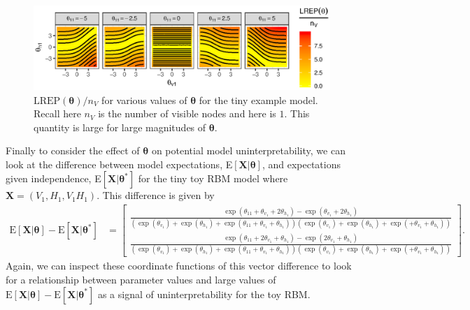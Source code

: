 \documentclass[]{article}
\theoremstyle{definition}
\newcommand{\nv}{{n_{\scriptscriptstyle V}}}
\begin{document}
\par
\begin{figure}

{\centering \includegraphics{paper_files/figure-latex/instab-1} 

}

\caption{$\text{LREP}(\boldsymbol \theta)/\nv$ for various values of $\boldsymbol \theta$ for the tiny example model. Recall here $\nv$ is the number of visible nodes and here is $1$. This quantity is large for large magnitudes of $\boldsymbol \theta$.}\label{fig:instab}
\end{figure}
Finally to consider the effect of \(\boldsymbol \theta\) on potential
model uninterpretability, we can look at the difference between model
expectations, E\(\left[\boldsymbol X | \boldsymbol \theta\right]\), and
expectations given independence,
E\(\left[\boldsymbol X | \boldsymbol \theta^*\right ]\) for the tiny toy
RBM model where \(\boldsymbol X = (V_1, H_1, V_1 H_1)\). This difference
is given by \begin{align*}
\text{E}\left[\boldsymbol X | \boldsymbol \theta\right] -   \text{E}\left[\boldsymbol X | \boldsymbol \theta^* \right] 
&= \left[
\begin{matrix}
\frac{\exp\left(\theta_{11} + \theta_{v_1} + 2\theta_{h_1}\right) - \exp\left( \theta_{v_1} + 2\theta_{h_1}\right) }{\left(\exp\left(\theta_{v_1}\right) + \exp\left(\theta_{h_1}\right) + \exp\left(\theta_{11} + \theta_{v_1} + \theta_{h_1}\right)\right)\left(\exp\left(\theta_{v_1}\right) + \exp\left(\theta_{h_1}\right) + \exp\left(+ \theta_{v_1} + \theta_{h_1}\right)\right)} \\
\frac{\exp\left(\theta_{11} + 2\theta_{v_1} + \theta_{h_1}\right) - \exp\left( 2\theta_{v_1} + \theta_{h_1}\right)  }{\left(\exp\left(\theta_{v_1}\right) + \exp\left(\theta_{h_1}\right) + \exp\left(\theta_{11} + \theta_{v_1} + \theta_{h_1}\right)\right)\left(\exp\left(\theta_{v_1}\right) + \exp\left(\theta_{h_1}\right) + \exp\left(+ \theta_{v_1} + \theta_{h_1}\right)\right)}
\end{matrix}\right].
\end{align*}
Again, we can inspect these coordinate functions of this vector
difference to look for a relationship between parameter values and large
values of
\(\text{E}[\boldsymbol X|\boldsymbol \theta] - \text{E}[\boldsymbol X| \boldsymbol \theta^*]\)
as a signal of uninterpretability for the toy RBM.
\end{document}
